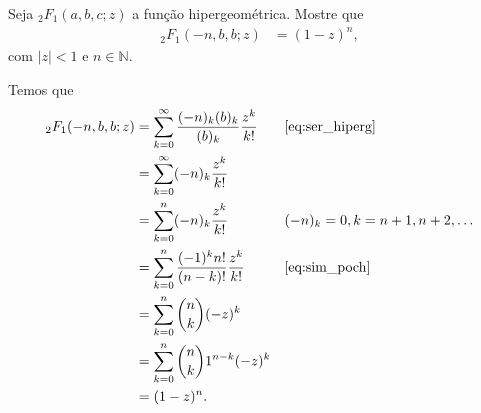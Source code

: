 \documentclass[a4paper,12pt, leqno, answers]{exam}
\begin{document}
\begin{questions}
    \question[P2 de 2006] Seja ${}_2F_1(a, b, c; z)$ a fun\c{c}\~{a}o hipergeom\'{e}trica. Mostre que
    \begin{align*}
        {}_2F_1(-n, b, b; z) &= (1 - z)^n,
    \end{align*}
    com $|z| < 1$ e $n \in \mathbb{N}$.
    \begin{solution}
        Temos que
        \begin{align*}
            {}_2F_1(-n, b, b; z) &= \sum_{k = 0}^\infty \frac{(-n)_k (b)_k}{(b)_k} \frac{z^k}{k!} && \text{\eqref{eq:ser_hiperg}} \\
            &= \sum_{k = 0}^\infty (-n)_k \frac{z^k}{k!} \\
            &= \sum_{k = 0}^n (-n)_k \frac{z^k}{k!} && (-n)_k = 0, k = n + 1, n + 2, \ldots \\
            &= \sum_{k = 0}^n \frac{(-1)^k n!}{(n - k)!} \frac{z^k}{k!} && \text{\eqref{eq:sim_poch}} \\
            &= \sum_{k = 0}^n \binom{n}{k} (-z)^k \\
            &= \sum_{k = 0}^n \binom{n}{k} 1^{n - k} (-z)^k \\
            &= (1 - z)^n.
        \end{align*}
    \end{solution}


\end{questions}
\end{document}
